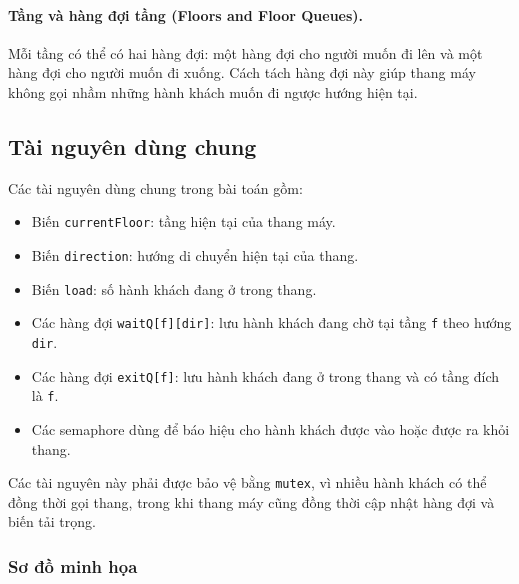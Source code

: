 \paragraph{Tầng và hàng đợi tầng (Floors and Floor Queues).}

Mỗi tầng có thể có hai hàng đợi: một hàng đợi cho người muốn đi lên và
một hàng đợi cho người muốn đi xuống. Cách tách hàng đợi này giúp thang
máy không gọi nhầm những hành khách muốn đi ngược hướng hiện tại.

\subsection{Tài nguyên dùng chung}

Các tài nguyên dùng chung trong bài toán gồm:

\begin{itemize}
    \item Biến \texttt{currentFloor}: tầng hiện tại của thang máy.
    \item Biến \texttt{direction}: hướng di chuyển hiện tại của thang.
    \item Biến \texttt{load}: số hành khách đang ở trong thang.
    \item Các hàng đợi \texttt{waitQ[f][dir]}: lưu hành khách đang chờ tại
    tầng \texttt{f} theo hướng \texttt{dir}.
    \item Các hàng đợi \texttt{exitQ[f]}: lưu hành khách đang ở trong thang
    và có tầng đích là \texttt{f}.
    \item Các semaphore dùng để báo hiệu cho hành khách được vào hoặc được
    ra khỏi thang.
\end{itemize}

Các tài nguyên này phải được bảo vệ bằng \texttt{mutex}, vì nhiều hành
khách có thể đồng thời gọi thang, trong khi thang máy cũng đồng thời cập
nhật hàng đợi và biến tải trọng.

\subsubsection*{Sơ đồ minh họa}

